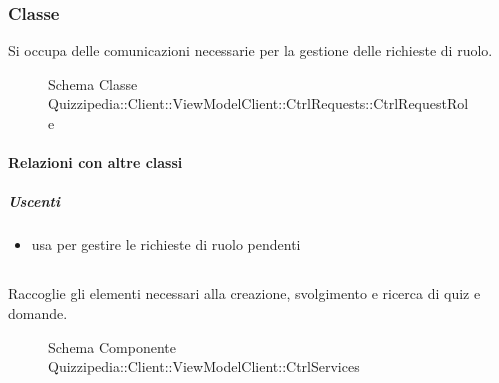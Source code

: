 \subsubsection{Classe }
Si occupa delle comunicazioni necessarie per la gestione delle richieste di ruolo.
\begin{figure}[H]
\centering
\noindent{}
\caption[Schema Classe CtrlRequestRole]{Schema Classe Quizzipedia::Client::ViewModelClient::CtrlRequests::CtrlRequestRole}
\end{figure}
\paragraph{Relazioni con altre classi}
\subparagraph{Uscenti}
\begin{itemize}
\item usa  per gestire le richieste di ruolo pendenti
\end{itemize}
\subsection{}
Raccoglie gli elementi necessari alla creazione, svolgimento e ricerca di quiz e domande.
\begin{figure}[H]
\centering
\noindent{}
\caption[Schema Componente Quizzipedia::Client::ViewModelClient::CtrlServices]{Schema Componente Quizzipedia::Client::ViewModelClient::CtrlServices}
\end{figure}
